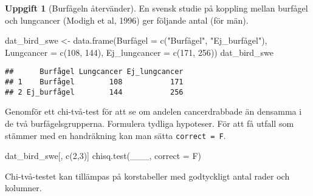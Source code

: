 \documentclass[
]{book}
\newenvironment{Shaded}{\begin{snugshade}}{\end{snugshade}}
\newcommand{\AttributeTok}[1]{\textcolor[rgb]{0.77,0.63,0.00}{#1}}
\newcommand{\DecValTok}[1]{\textcolor[rgb]{0.00,0.00,0.81}{#1}}
\newcommand{\FunctionTok}[1]{\textcolor[rgb]{0.00,0.00,0.00}{#1}}
\newcommand{\NormalTok}[1]{#1}
\newcommand{\OtherTok}[1]{\textcolor[rgb]{0.56,0.35,0.01}{#1}}
\newcommand{\StringTok}[1]{\textcolor[rgb]{0.31,0.60,0.02}{#1}}
\theoremstyle{definition}
\theoremstyle{definition}
\theoremstyle{definition}
\newtheorem{exercise}{Uppgift}[chapter]
\theoremstyle{definition}
\theoremstyle{remark}
\begin{document}
\begin{exercise}[Burfågeln återvänder]

En svensk studie på koppling mellan burfågel och lungcancer (Modigh et al, 1996) ger följande antal (för män).

\begin{Shaded}
\begin{Highlighting}[]
\NormalTok{dat\_bird\_swe }\OtherTok{\textless{}{-}} \FunctionTok{data.frame}\NormalTok{(Burfågel }\OtherTok{=} \FunctionTok{c}\NormalTok{(}\StringTok{"Burfågel"}\NormalTok{, }\StringTok{"Ej\_burfågel"}\NormalTok{),}
              \AttributeTok{Lungcancer =} \FunctionTok{c}\NormalTok{(}\DecValTok{108}\NormalTok{, }\DecValTok{144}\NormalTok{),}
              \AttributeTok{Ej\_lungcancer =} \FunctionTok{c}\NormalTok{(}\DecValTok{171}\NormalTok{, }\DecValTok{256}\NormalTok{))}
\NormalTok{dat\_bird\_swe}
\end{Highlighting}
\end{Shaded}

\begin{verbatim}
##      Burfågel Lungcancer Ej_lungcancer
## 1    Burfågel        108           171
## 2 Ej_burfågel        144           256
\end{verbatim}

Genomför ett chi-två-test för att se om andelen cancerdrabbade än densamma i de två burfågelsgrupperna. Formulera tydliga hypoteser. För att få utfall som stämmer med en handräkning kan man sätta \texttt{correct\ =\ F}.

\begin{Shaded}
\begin{Highlighting}[]
\NormalTok{dat\_bird\_swe[, }\FunctionTok{c}\NormalTok{(}\DecValTok{2}\NormalTok{,}\DecValTok{3}\NormalTok{)]}
\FunctionTok{chisq.test}\NormalTok{(\_\_\_, }\AttributeTok{correct =}\NormalTok{ F)}
\end{Highlighting}
\end{Shaded}

\end{exercise}

Chi-två-testet kan tillämpas på korstabeller med godtyckligt antal rader och kolumner.
\end{document}
